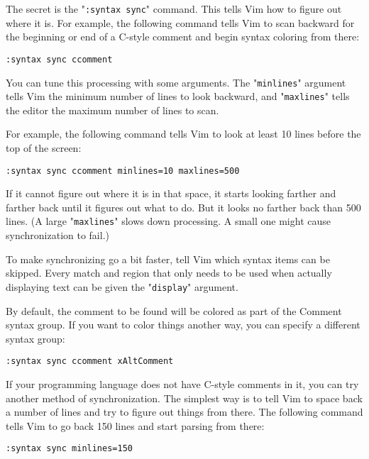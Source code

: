 The secret is the "\verb!:syntax sync!" command.
This tells Vim how to figure out where it is.
For example, the following command tells Vim to scan backward for the beginning or end of a C-style comment and begin syntax coloring from there:

\begin{Verbatim}[samepage=true]
 :syntax sync ccomment
\end{Verbatim}

You can tune this processing with some arguments.
The "\verb!minlines!" argument tells Vim the minimum number of lines to look backward, and "\verb!maxlines!" tells the editor the maximum number of lines to scan.

For example, the following command tells Vim to look at least 10 lines before the top of the screen:

\begin{Verbatim}[samepage=true]
 :syntax sync ccomment minlines=10 maxlines=500
\end{Verbatim}

If it cannot figure out where it is in that space, it starts looking farther and farther back until it figures out what to do.
But it looks no farther back than 500 lines.
(A large "\verb!maxlines!" slows down processing.
A small one might cause synchronization to fail.)

To make synchronizing go a bit faster, tell Vim which syntax items can be skipped.
Every match and region that only needs to be used when actually displaying text can be given the "\verb!display!" argument.

By default, the comment to be found will be colored as part of the Comment syntax group.
If you want to color things another way, you can specify a different syntax group:

\begin{Verbatim}[samepage=true]
 :syntax sync ccomment xAltComment
\end{Verbatim}

If your programming language does not have C-style comments in it, you can try another method of synchronization.
The simplest way is to tell Vim to space back a number of lines and try to figure out things from there.
The following command tells Vim to go back 150 lines and start parsing from there:

\begin{Verbatim}[samepage=true]
 :syntax sync minlines=150
\end{Verbatim}


